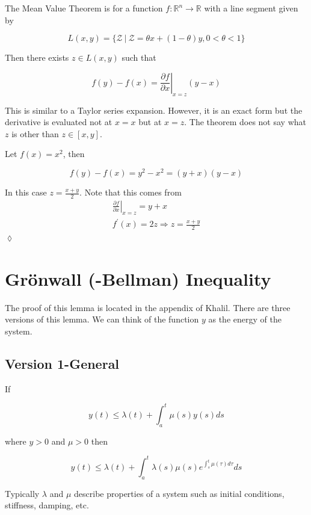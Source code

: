 \begin{theorem}
The Mean Value Theorem is for a function $f:\mathbb{R}^n\to\mathbb{R}$ with a line segment given by

\begin{equation*}
L (x,y) = \{\mathcal{Z}~|~\mathcal{Z} = \theta{} x + (1-\theta) y, 0<\theta<1\}
\end{equation*}

Then there exists $z\in{} L (x,y)$ such that

\begin{equation*}
f (y)-f (x) = \left.\frac{\partial{} f}{\partial{} x}\right|_{x=z} (y-x)
\end{equation*}

\end{theorem}
This is similar to a Taylor series expansion.
However, it is an exact form but the derivative is evaluated not at $x=x$ but at $x=z$.
The theorem does not say what $z$ is other than $z\in[x,y]$.

\begin{example}
Let $f (x) = x^2$, then

\begin{equation*}
f (y)-f (x) = y^2-x^2 = (y+x) (y-x)
\end{equation*}

In this case $z=\frac{x+y}{2}$.
Note that this comes from
\begin{align*}
\left.\frac{\partial f}{\partial x}\right|_{x=z} = y+x \\
f^\prime(x) = 2z \Rightarrow z = \frac{x+y}{2}
\end{align*}
$\lozenge$
\end{example}

\section{Gr\"onwall (-Bellman) Inequality}%
\label{sec:04gronwall}
The proof of this lemma is located in the appendix of Khalil.
There are three versions of this lemma.
We can think of the function $y$ as the energy of the system.

\subsection{Version 1-General}
\begin{lemma}
If

\begin{equation*}
y(t) \leq \lambda(t) + \int_a^t\mu(s)y(s)ds
\end{equation*}

where $y>0$ and $\mu>0$ then

\begin{equation*}
y(t) \leq \lambda(t) + \int_a^t \lambda(s)\mu(s) e^{\int_s^t\mu(\tau)d\tau}ds
\end{equation*}

\end{lemma}
Typically $\lambda$ and $\mu$ describe properties of a system such as initial conditions, stiffness, damping, etc.

